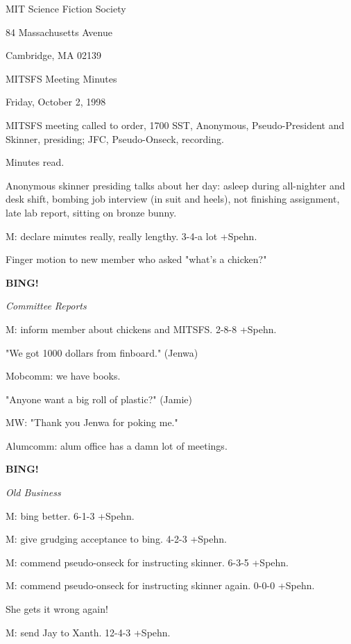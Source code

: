 \documentclass[12pt]{article}
\newcommand{\bing}{{\bf BING!} }
\newcommand{\goto}[1]{\bing \vskip 12pt \centerline{{\em{#1}}}}
\begin{document}
\begin{center}

MIT Science Fiction Society 

84 Massachusetts Avenue

Cambridge, MA 02139

\vspace{12pt}

MITSFS Meeting Minutes 

Friday, October 2, 1998

\end{center}
 
\vspace{18pt}

\setlength{\parskip}{6pt}

\noindent
MITSFS meeting called to order, 1700 SST,
Anonymous, Pseudo-President and Skinner, presiding; JFC, Pseudo-Onseck, recording.

Minutes read.

Anonymous skinner presiding talks about her day: asleep during all-nighter and desk shift, bombing job interview (in suit and heels), not finishing assignment, late lab report, sitting on bronze bunny.

M: declare minutes really, really lengthy. 3-4-a lot +Spehn.

Finger motion to new member who asked "what's a chicken?"

\goto{Committee Reports}

M: inform member about chickens and MITSFS. 2-8-8 +Spehn.

"We got 1000 dollars from finboard." (Jenwa)

Mobcomm: we have books.

"Anyone want a big roll of plastic?" (Jamie)

MW: "Thank you Jenwa for poking me."

Alumcomm: alum office has a damn lot of meetings.

\goto{Old Business}

M: bing better. 6-1-3 +Spehn.

M: give grudging acceptance to bing. 4-2-3 +Spehn.

M: commend pseudo-onseck for instructing skinner. 6-3-5 +Spehn.

M: commend pseudo-onseck for instructing skinner again. 0-0-0 +Spehn.

She gets it wrong again!

M: send Jay to Xanth. 12-4-3 +Spehn.
\end{document}
